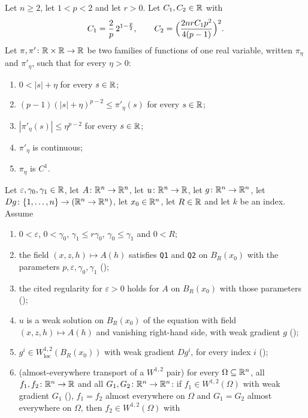 \begin{helper}
Let $n\ge2$, let $1<p<2$ and let $r>0$.  Let $C_1,C_2\in\mathbb{R}$ with
\[
C_1=\frac2p\,2^{1-\frac p2},
\qquad
C_2=\Bigl(\frac{2nrC_1p^2}{4(p-1)}\Bigr)^{2}.
\]
Let $\pi,\pi'\colon\mathbb{R}\times\mathbb{R}\to\mathbb{R}$ be two families of functions of one real
variable, written $\pi_\eta$ and $\pi'_\eta$, such that for every $\eta>0$:
\begin{enumerate}
\item[(H1)] $0<|s|+\eta$ for every $s\in\mathbb{R}$;
\item[(H2)] $(p-1)(|s|+\eta)^{p-2}\le\pi'_\eta(s)$ for every $s\in\mathbb{R}$;
\item[(H3)] $|\pi'_\eta(s)|\le\eta^{p-2}$ for every $s\in\mathbb{R}$;
\item[(H4)] $\pi'_\eta$ is continuous;
\item[(H5)] $\pi_\eta$ is $C^1$.
\end{enumerate}
Let $\varepsilon,\gamma_0,\gamma_1\in\mathbb{R}$, let
$A\colon\mathbb{R}^n\to\mathbb{R}^n$, let $u\colon\mathbb{R}^n\to\mathbb{R}$, let $g\colon\mathbb{R}^n\to\mathbb{R}^n$, let
$Dg\colon\{1,\dots,n\}\to(\mathbb{R}^n\to\mathbb{R}^n)$, let $x_0\in\mathbb{R}^n$, let $R\in\mathbb{R}$ and let
$k$ be an index.  Assume
\begin{enumerate}
\item[(H6)] $0<\varepsilon$, $0<\gamma_0$, $\gamma_1\le r\gamma_0$,
  $\gamma_0\le\gamma_1$ and $0<R$;
\item[(H7)] the field $(x,z,h)\mapsto A(h)$ satisfies \texttt{Q1} and
  \texttt{Q2} on $B_R(x_0)$ with the parameters
  $p,\varepsilon,\gamma_0,\gamma_1$ ();
\item[(H8)] the cited regularity for $\varepsilon>0$ holds for $A$ on
  $B_R(x_0)$ with those parameters ();
\item[(H9)] $u$ is a weak solution on $B_R(x_0)$ of the equation with field
  $(x,z,h)\mapsto A(h)$ and vanishing right-hand side, with weak gradient $g$
  ();
\item[(H10)] $g^i\in W^{1,2}_{\mathrm{loc}}(B_R(x_0))$ with weak gradient
  $Dg^i$, for every index $i$ ();
\item[(H11)] (almost-everywhere transport of a $W^{1,2}$ pair) for every
  $\Omega\subseteq\mathbb{R}^n$, all $f_1,f_2\colon\mathbb{R}^n\to\mathbb{R}$ and all
  $G_1,G_2\colon\mathbb{R}^n\to\mathbb{R}^n$: if $f_1\in W^{1,2}(\Omega)$ with weak gradient
  $G_1$ (), $f_1=f_2$ almost everywhere on $\Omega$ and
  $G_1=G_2$ almost everywhere on $\Omega$, then $f_2\in W^{1,2}(\Omega)$ with

\end{enumerate}
\end{helper}
